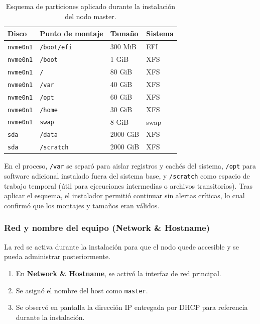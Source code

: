 \begin{table}[H]
\centering
\caption{Esquema de particiones aplicado durante la instalación del nodo master.}
\label{tab:particiones_master}
\begin{tabular}{llll}
\hline
\textbf{Disco} & \textbf{Punto de montaje} & \textbf{Tamaño} & \textbf{Sistema} \\
\hline
\texttt{nvme0n1} & \texttt{/boot/efi} & 300 MiB & EFI \\
\texttt{nvme0n1} & \texttt{/boot} & 1 GiB & XFS \\
\texttt{nvme0n1} & \texttt{/} & 80 GiB & XFS \\
\texttt{nvme0n1} & \texttt{/var} & 40 GiB & XFS \\
\texttt{nvme0n1} & \texttt{/opt} & 60 GiB & XFS \\
\texttt{nvme0n1} & \texttt{/home} & 30 GiB & XFS \\
\texttt{nvme0n1} & \texttt{swap} & 8 GiB & swap \\
\texttt{sda} & \texttt{/data} & 2000 GiB & XFS \\
\texttt{sda} & \texttt{/scratch} & 2000 GiB & XFS \\
\hline
\end{tabular}
\end{table}

En el proceso, \texttt{/var} se separó para aislar registros y cachés del sistema, \texttt{/opt} para software adicional instalado fuera del sistema base, y \texttt{/scratch} como espacio de trabajo temporal (útil para ejecuciones intermedias o archivos transitorios). Tras aplicar el esquema, el instalador permitió continuar sin alertas críticas, lo cual confirmó que los montajes y tamaños eran válidos.

\subsubsection*{Red y nombre del equipo (Network \& Hostname)}
La red se activa durante la instalación para que el nodo quede accesible y se pueda administrar posteriormente.

\begin{enumerate}
  \item En \textbf{Network \& Hostname}, se activó la interfaz de red principal.
  \item Se asignó el nombre del host como \texttt{master}.
  \item Se observó en pantalla la dirección IP entregada por DHCP para referencia durante la instalación. \cite{rocky_install_9_6}
\end{enumerate}

